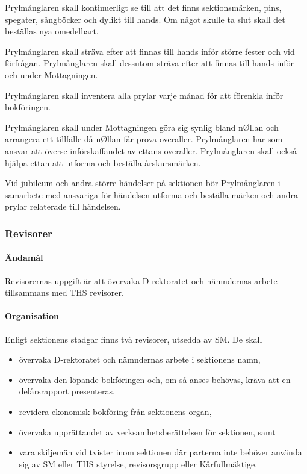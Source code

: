 \documentclass{dgovdoc}
\begin{document}
Prylmånglaren skall kontinuerligt se till att det finns sektionsmärken, pins, spegater, sångböcker och dylikt till hands. Om något skulle ta slut skall det beställas nya omedelbart.

Prylmånglaren skall sträva efter att finnas till hands inför större fester och vid förfrågan. Prylmånglaren skall dessutom sträva efter att finnas till hands inför och under Mottagningen.

Prylmånglaren skall inventera alla prylar varje månad för att förenkla inför bokföringen.

Prylmånglaren skall under Mottagningen göra sig synlig bland nØllan och arrangera ett tillfälle då nØllan får prova overaller. Prylmånglaren har som ansvar att överse införskaffandet av ettans overaller. Prylmånglaren skall också hjälpa ettan att utforma och beställa årskursmärken.

Vid jubileum och andra större händelser på sektionen bör Prylmånglaren i samarbete med ansvariga för händelsen utforma och beställa märken och andra prylar relaterade till händelsen.

\subsubsection{Revisorer}

\paragraph{Ändamål}

Revisorernas uppgift är att övervaka D-rektoratet och nämndernas arbete tillsammans med THS revisorer.

\paragraph{Organisation}

Enligt sektionens stadgar finns två revisorer, utsedda av SM. De skall

\begin{itemize}
  \item övervaka D-rektoratet och nämndernas arbete i sektionens namn,
  \item övervaka den löpande bokföringen och, om så anses behövas, kräva att en delårsrapport presenteras,
  \item revidera ekonomisk bokföring från sektionens organ,
  \item övervaka upprättandet av verksamhetsberättelsen för sektionen, samt
  \item vara skiljemän vid tvister inom sektionen där parterna inte behöver använda sig av SM eller THS styrelse, revisorsgrupp eller Kårfullmäktige.
\end{itemize}
\end{document}
